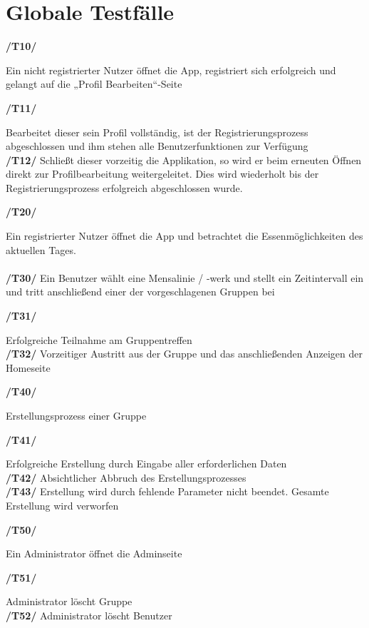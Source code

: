 \documentclass[a4paper]{scrreprt}
\begin{document}
\chapter{Globale Testfälle}

\begin{addmargin}[25pt]{0pt} 
\hypertarget{t10}{\textbf{/T10/}} Ein nicht registrierter Nutzer öffnet die App, registriert sich erfolgreich und gelangt auf die „Profil Bearbeiten“-Seite\\
  \begin{addmargin}[25pt]{0pt} 
  \hypertarget{t11}{\textbf{/T11/}} Bearbeitet dieser sein Profil vollständig, ist der Registrierungsprozess abgeschlossen und ihm stehen alle Benutzerfunktionen zur Verfügung\\
  \hypertarget{t12}{\textbf{/T12/}} Schließt dieser vorzeitig die Applikation, so wird er beim erneuten Öffnen direkt zur Profilbearbeitung weitergeleitet. Dies wird wiederholt bis der Registrierungsprozess erfolgreich abgeschlossen wurde.\\
  \end{addmargin}
\hypertarget{t20}{\textbf{/T20/}} Ein registrierter Nutzer öffnet die App und betrachtet die Essenmöglichkeiten des aktuellen Tages.\\ \\
\hypertarget{t30}{\textbf{/T30/}} Ein Benutzer wählt eine Mensalinie / -werk und stellt ein Zeitintervall ein und tritt anschließend einer der vorgeschlagenen Gruppen bei\\
  \begin{addmargin}[25pt]{0pt} 
  \hypertarget{t31}{\textbf{/T31/}} Erfolgreiche Teilnahme am Gruppentreffen\\
  \hypertarget{t32}{\textbf{/T32/}} Vorzeitiger Austritt aus der Gruppe und das anschließenden Anzeigen der Homeseite\\
  \end{addmargin}
\hypertarget{t40}{\textbf{/T40/}}  Erstellungsprozess einer Gruppe\\
  \begin{addmargin}[25pt]{0pt} 
  \hypertarget{t41}{\textbf{/T41/}} Erfolgreiche Erstellung durch Eingabe aller erforderlichen Daten\\
  \hypertarget{t42}{\textbf{/T42/}} Absichtlicher Abbruch des Erstellungsprozesses\\
  \hypertarget{t43}{\textbf{/T43/}} Erstellung wird durch fehlende Parameter nicht beendet. Gesamte Erstellung wird verworfen\\
  \end{addmargin}
\hypertarget{t50}{\textbf{/T50/}} Ein Administrator öffnet die Adminseite\\
  \begin{addmargin}[25pt]{0pt} 
  \hypertarget{t10}{\textbf{/T51/}} Administrator löscht Gruppe\\
  \hypertarget{t10}{\textbf{/T52/}} Administrator löscht Benutzer\\
  \end{addmargin}



\end{addmargin}
\end{document}
